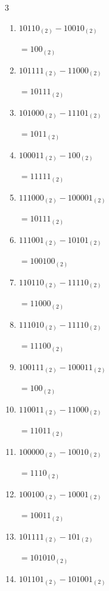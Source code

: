 \begin{multicols}{3}
\begin{enumerate}
        $=11011_{(2)}$

  \item $10110_{(2)} - 10010_{(2)}$

        $=100_{(2)}$

  \item $101111_{(2)} - 11000_{(2)}$

        $=10111_{(2)}$

  \item $101000_{(2)} - 11101_{(2)}$

        $=1011_{(2)}$

  \item $100011_{(2)} - 100_{(2)}$

        $=11111_{(2)}$

  \item $111000_{(2)} - 100001_{(2)}$

        $=10111_{(2)}$

  \item $111001_{(2)} - 10101_{(2)}$

        $=100100_{(2)}$

\columnbreak %

  \item $110110_{(2)} - 11110_{(2)}$

        $=11000_{(2)}$

  \item $111010_{(2)} - 11110_{(2)}$

        $=11100_{(2)}$

  \item $100111_{(2)} - 100011_{(2)}$

        $=100_{(2)}$

  \item $110011_{(2)} - 11000_{(2)}$

        $=11011_{(2)}$

  \item $100000_{(2)} - 10010_{(2)}$

        $=1110_{(2)}$

  \item $100100_{(2)} - 10001_{(2)}$

        $=10011_{(2)}$

  \item $101111_{(2)} - 101_{(2)}$

        $=101010_{(2)}$

  \item $101101_{(2)} - 101001_{(2)}$


\end{enumerate}
\end{multicols}
